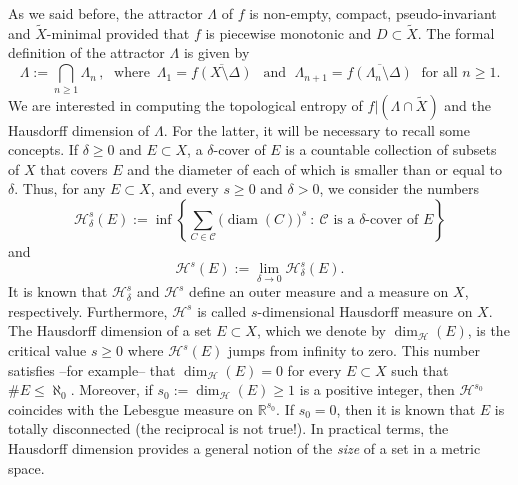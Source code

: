 \documentclass[a4paper]{article}
\DeclareMathOperator{\diam}{diam}
\begin{document}
As we said before, the attractor $\Lambda$ of $f$ is non-empty, compact, pseudo-invariant and $\widetilde X$-minimal provided that $f$ is piecewise monotonic and $D\subset\widetilde X$. The formal definition of the attractor $\Lambda$ is given by 
\[
    \Lambda:=\bigcap_{n\geq1}\Lambda_n\,, \;\text{ where $\,\Lambda_1=\overline{f(X\setminus\Delta)}\;\,$ and $\;\Lambda_{n+1}=\overline{f(\Lambda_n\setminus\Delta)}\;$ for all $n\geq1$.}
\]
We are interested in computing the topological entropy of $f|(\Lambda\cap\widetilde X)$ and the Hausdorff dimension of $\Lambda$. For the latter, it will be necessary to recall some concepts. If $\delta\geq0$ and $E\subset X$, a $\delta$-cover of $E$ is a countable collection of subsets of $X$ that covers $E$ and {the diameter of each of which is} smaller than or equal to $\delta$. Thus, {for any $E\subset X$, and every $s\geq0$ and $\delta>0$,} we consider the numbers
\[
    \mathcal H_\delta^s(E):=\inf\left\{\sum_{C\in\mathcal C}\big(\!\diam(C)\big)^s\ :\ \text{$\mathcal C$ is a $\delta$-cover of $E$}\right\}
\]
and
\[
\mathcal H^s(E):=\lim_{\delta\to0}\mathcal H_\delta^s(E).
\]
It is known that $\mathcal H^s_\delta$ and $\mathcal H^s$ define an outer measure and a measure on $X$, respectively. Furthermore, $\mathcal H^s$ is called $s$-dimensional Hausdorff measure on $X$. The Hausdorff dimension of a set $E\subset X$, which we denote by $\dim_{\mathcal H}(E)$, is the critical value $s\geq0$ where $\mathcal H^s(E)$ jumps from infinity to zero. This number satisfies --for example-- that $\dim_{\mathcal H}(E)=0$ for every $E\subset X$ such that $\#E\leq\aleph_0$. Moreover, if $s_0:=\dim_{\mathcal H}(E)\geq1$ is a positive integer, then $\mathcal H^{s_0}$ coincides with the Lebesgue measure on $\mathbb R^{s_0}$. If $s_0=0$, then it is known that $E$ is totally disconnected (the reciprocal is not true!). In practical terms, the Hausdorff dimension provides a general notion of the {\em size} of a set in a metric space.
\end{document}
